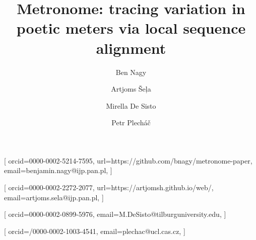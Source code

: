 \documentclass[
    hf
]{ceurart}
\begin{document}

\conference{}
\title{Metronome: tracing variation in poetic meters via local sequence alignment}


\author[1]{Ben Nagy}[%
    orcid=0000-0002-5214-7595,
    url=https://github.com/bnagy/metronome-paper,
    email=benjamin.nagy@ijp.pan.pl,
]

\author[1]{Artjoms Šeļa}[%
    orcid=0000-0002-2272-2077,
    url=https://artjomsh.github.io/web/,
    email=artjoms.sela@ijp.pan.pl,
]

\author[2]{Mirella {De Sisto}}[%
    orcid=0000-0002-0899-5976,
    email=M.DeSisto@tilburguniversity.edu,
]

\author[3]{Petr Plecháč}[%
    orcid=/0000-0002-1003-4541,
    email=plechac@ucl.cas.cz,
]

\address[1]{Institute of Polish Language, Polish Academy of Sciences (IJP PAN), Kraków}

\address[2]{Tilburg University}

\address[3]{Institute of Czech Literature, Czech Academy of Sciences, Prague}
\end{document}
